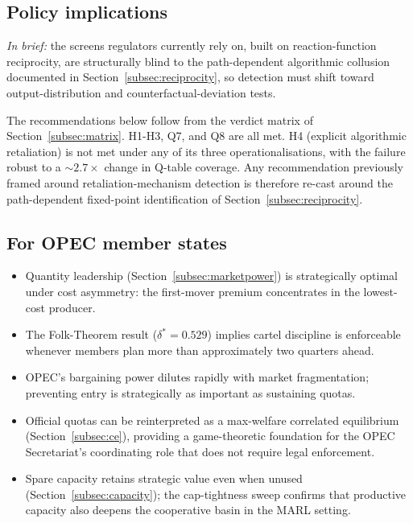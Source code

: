 \subsection{Policy implications}
\label{sec:policy}

\emph{In brief:} the screens regulators currently rely on, built on
reaction-function reciprocity, are structurally blind to the
path-dependent algorithmic collusion documented in
Section~\ref{subsec:reciprocity}, so detection must shift toward
output-distribution and counterfactual-deviation tests.

The recommendations below follow from the verdict matrix of
Section~\ref{subsec:matrix}. H1-H3, Q7, and Q8 are all met.
H4 (explicit algorithmic retaliation) is not met under any of
its three operationalisations, with the failure robust to a
${\sim}2.7\times$ change in Q-table coverage. Any recommendation
previously framed around retaliation-mechanism detection is
therefore re-cast around the path-dependent fixed-point
identification of Section~\ref{subsec:reciprocity}.

\subsection*{For OPEC member states}

\begin{itemize}\itemsep2pt

  \item Quantity leadership (Section~\ref{subsec:marketpower}) is strategically
        optimal under cost asymmetry: the first-mover premium
        concentrates in the lowest-cost producer.

  \item The Folk-Theorem result ($\delta^\ast = 0.529$) implies
        cartel discipline is enforceable whenever members plan
        more than approximately two quarters ahead.

  \item OPEC's bargaining power dilutes rapidly with market
        fragmentation; preventing entry is strategically as
        important as sustaining quotas.

  \item Official quotas can be reinterpreted as a max-welfare
        correlated equilibrium (Section~\ref{subsec:ce}), providing a
        game-theoretic foundation for the OPEC Secretariat's
        coordinating role that does not require legal
        enforcement.

  \item Spare capacity retains strategic value even when unused
        (Section~\ref{subsec:capacity}); the cap-tightness sweep confirms that
        productive capacity also deepens the cooperative basin
        in the MARL setting.

\end{itemize}

